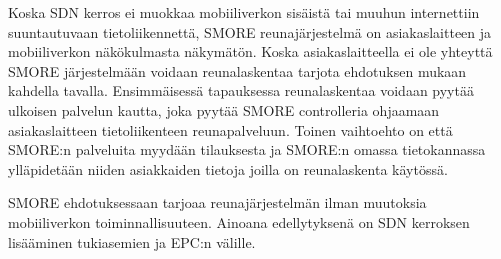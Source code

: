 Koska SDN kerros ei muokkaa mobiiliverkon sisäistä tai muuhun  internettiin suuntautuvaan tietoliikennettä, SMORE reunajärjestelmä on asiakaslaitteen ja mobiiliverkon näkökulmasta näkymätön. Koska asiakaslaitteella ei ole yhteyttä SMORE järjestelmään voidaan reunalaskentaa tarjota ehdotuksen mukaan kahdella tavalla. Ensimmäisessä tapauksessa reunalaskentaa voidaan pyytää ulkoisen palvelun kautta, joka pyytää SMORE controlleria ohjaamaan asiakaslaitteen tietoliikenteen reunapalveluun. Toinen vaihtoehto on että SMORE:n palveluita myydään tilauksesta ja SMORE:n omassa tietokannassa ylläpidetään niiden asiakkaiden tietoja joilla on reunalaskenta käytössä. 

SMORE ehdotuksessaan tarjoaa reunajärjestelmän ilman muutoksia mobiiliverkon toiminnallisuuteen. Ainoana edellytyksenä on SDN kerroksen lisääminen tukiasemien ja EPC:n välille. 

